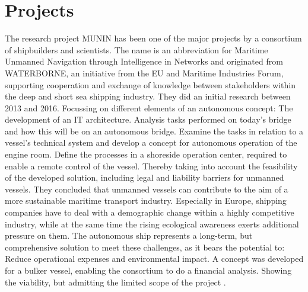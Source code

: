 \section{Projects}
The research project MUNIN has been one of the major projects by a consortium of shipbuilders and scientists. The name is an abbreviation for Maritime Unmanned Navigation through Intelligence in Networks and originated from WATERBORNE, an initiative from the EU and Maritime Industries Forum, supporting cooperation and exchange of knowledge between stakeholders within the deep and short sea shipping industry. They did an initial research between 2013 and 2016. Focussing on different elements of an autonomous concept: The development of an IT architecture. Analysis tasks performed on today's bridge and how this will be on an autonomous bridge. Examine the tasks in relation to a vessel’s technical system and develop a concept for autonomous operation of the engine room. Define the processes in a shoreside operation center, required to enable a remote control of the vessel. Thereby taking into account the feasibility of the developed solution, including legal and liability barriers for unmanned vessels.
They concluded that unmanned vessels can contribute to the aim of a more sustainable maritime transport industry. Especially in Europe, shipping companies have to deal with a demographic change within a highly competitive industry, while at the same time the rising ecological awareness exerts additional pressure on them. The autonomous ship represents a long-term, but comprehensive solution to meet these challenges, as it bears the potential to: Reduce operational expenses and
environmental impact.
A concept was developed for a bulker vessel, enabling the consortium to do a financial analysis. Showing the viability, but admitting the limited scope of the project \cite{MUNIN2016}.

